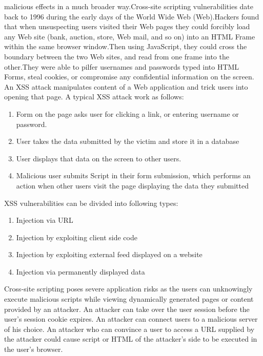malicious effects in a much broader way.Cross-site scripting vulnerabilities date back to 1996 during the early days of the World
Wide Web (Web).Hackers found that when unsuspecting users visited their Web pages they could forcibly
load any Web site (bank, auction, store, Web mail, and so on) into an HTML Frame within
the same browser window.Then using JavaScript, they could cross the boundary between
the two Web sites, and read from one frame into the other.They were able to pilfer usernames and passwords typed into HTML Forms, steal cookies, or compromise any confidential information on the screen.\\
\newline
An  XSS  attack  manipulates  content  of  a  Web  application 
and  trick  users  into  opening  that  page.  A  typical
XSS  attack work as follows:
\begin{enumerate}
	\item Form  on  the  page  asks  user  for  clicking  a  link,  or 
	entering username or password.
	\item  User takes the data submitted by the victim and store it 
	in a database
	\item User displays that data on the screen to other users.
	\item Malicious user submits Script in their form submission, 
	which  performs  an  action  when  other  users  visit  the  page 
	displaying the data they submitted
\end{enumerate}
XSS vulnerabilities can be divided into following types:
\begin{enumerate}
	\item Injection via URL
	\item Injection by exploiting client side code
	\item Injection by exploiting external feed displayed on a website
	\item Injection via permanently displayed data
\end{enumerate}
Cross-site scripting poses severe application risks as the users can unknowingly execute malicious scripts while viewing
dynamically generated pages or content provided by an attacker. An attacker can take over the user session before the
user's session cookie expires. An attacker can connect users to a malicious server of his choice. An attacker who can
convince a user to access a URL supplied by the attacker could cause script or HTML of the attacker's side to be
executed in the user's browser.\\
\newline
